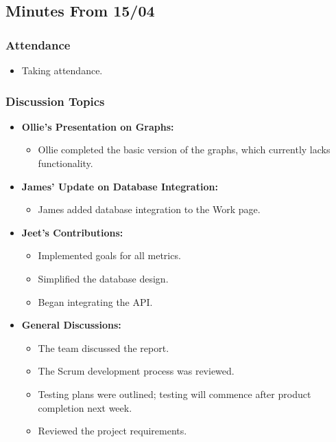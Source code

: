 \documentclass[12pt]{article}
\begin{document}
\hypertarget{minutes-from-1504}{%
\subsection{Minutes From 15/04}\label{minutes-from-1504}}

\hypertarget{attendance-3}{%
\subsubsection{Attendance}\label{attendance-3}}

\begin{itemize}
\tightlist
\item
  Taking attendance.
\end{itemize}

\hypertarget{discussion-topics-2}{%
\subsubsection{Discussion Topics}\label{discussion-topics-2}}

\begin{itemize}
\tightlist
\item
  \textbf{Ollie's Presentation on Graphs:}

  \begin{itemize}
  \tightlist
  \item
    Ollie completed the basic version of the graphs, which currently
    lacks functionality.
  \end{itemize}
\item
  \textbf{James' Update on Database Integration:}

  \begin{itemize}
  \tightlist
  \item
    James added database integration to the Work page.
  \end{itemize}
\item
  \textbf{Jeet's Contributions:}

  \begin{itemize}
  \tightlist
  \item
    Implemented goals for all metrics.
  \item
    Simplified the database design.
  \item
    Began integrating the API.
  \end{itemize}
  \newpage
\item
  \textbf{General Discussions:}

  \begin{itemize}
  \tightlist
  \item
    The team discussed the report.
  \item
    The Scrum development process was reviewed.
  \item
    Testing plans were outlined; testing will commence after product
    completion next week.
  \item
    Reviewed the project requirements.
  \end{itemize}
\end{itemize}
\end{document}
